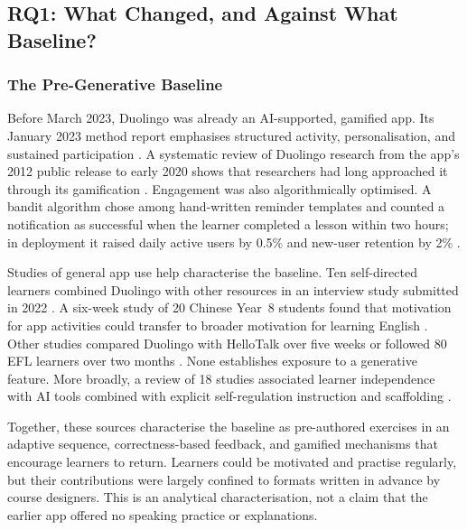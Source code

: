 \documentclass[11pt,titlepage]{article}
\begin{document}
\subsection{RQ1: What Changed, and Against What Baseline?}
\label{sec:rq1}
\subsubsection{The Pre-Generative Baseline}
Before March 2023, Duolingo was already an AI-supported, gamified app. Its January 2023 method report emphasises structured activity, personalisation, and sustained participation \parencite{freeman2023}. A systematic review of Duolingo research from the app's 2012 public release to early 2020 shows that researchers had long approached it through its gamification \parencite{shortt2023}. Engagement was also algorithmically optimised. A bandit algorithm chose among hand-written reminder templates and counted a notification as successful when the learner completed a lesson within two hours; in deployment it raised daily active users by 0.5\% and new-user retention by 2\% \parencite{yancey2020}.

Studies of general app use help characterise the baseline. Ten self-directed learners combined Duolingo with other resources in an interview study submitted in 2022 \parencite{liBonk2025}. A six-week study of 20 Chinese Year~8 students found that motivation for app activities could transfer to broader motivation for learning English \parencite{zeng2024}. Other studies compared Duolingo with HelloTalk over five weeks \parencite{zhao2024} or followed 80 EFL learners over two months \parencite{ouyang2024}. None establishes exposure to a generative feature. More broadly, a review of 18 studies associated learner independence with AI tools combined with explicit self-regulation instruction and scaffolding \parencite{mohebbi2025}.

Together, these sources characterise the baseline as pre-authored exercises in an adaptive sequence, correctness-based feedback, and gamified mechanisms that encourage learners to return. Learners could be motivated and practise regularly, but their contributions were largely confined to formats written in advance by course designers. This is an analytical characterisation, not a claim that the earlier app offered no speaking practice or explanations.
\end{document}
